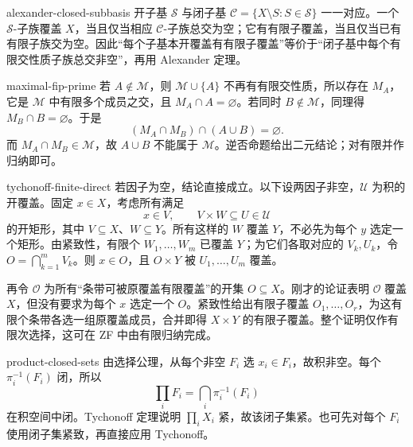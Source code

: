 \begin{solution}{alexander-closed-subbasis}
开子基 \(\mathcal S\) 与闭子基
\(\mathcal C=\{X\setminus S:S\in\mathcal S\}\) 一一对应。一个 \(\mathcal S\)-子族覆盖 \(X\)，当且仅当相应 \(\mathcal C\)-子族总交为空；它有有限子覆盖，当且仅当已有有限子族交为空。因此“每个子基本开覆盖有有限子覆盖”等价于“闭子基中每个有限交性质子族总交非空”，再用 Alexander 定理。
\end{solution}

\begin{solution}{maximal-fip-prime}
若 \(A\notin\mathcal M\)，则 \(\mathcal M\cup\{A\}\) 不再有有限交性质，所以存在 \(M_A\)，它是 \(\mathcal M\) 中有限多个成员之交，且 \(M_A\cap A=\varnothing\)。若同时 \(B\notin\mathcal M\)，同理得 \(M_B\cap B=\varnothing\)。于是
\[
 (M_A\cap M_B)\cap(A\cup B)=\varnothing.
\]
而 \(M_A\cap M_B\in\mathcal M\)，故 \(A\cup B\) 不能属于 \(\mathcal M\)。逆否命题给出二元结论；对有限并作归纳即可。
\end{solution}

\begin{solution}{tychonoff-finite-direct}
若因子为空，结论直接成立。以下设两因子非空，\(\mathcal U\) 为积的开覆盖。固定 \(x\in X\)，考虑所有满足
\[
 x\in V,\qquad V\times W\subseteq U\in\mathcal U
\]
的开矩形，其中 \(V\subseteq X\)、\(W\subseteq Y\)。所有这样的 \(W\) 覆盖 \(Y\)，不必先为每个 \(y\) 选定一个矩形。由紧致性，有限个 \(W_1,\ldots,W_m\) 已覆盖 \(Y\)；为它们各取对应的 \(V_k,U_k\)，令 \(O=\bigcap_{k=1}^m V_k\)。则 \(x\in O\)，且 \(O\times Y\) 被 \(U_1,\ldots,U_m\) 覆盖。

再令 \(\mathcal O\) 为所有“条带可被原覆盖有限覆盖”的开集 \(O\subseteq X\)。刚才的论证表明 \(\mathcal O\) 覆盖 \(X\)，但没有要求为每个 \(x\) 选定一个 \(O\)。紧致性给出有限子覆盖 \(O_1,\ldots,O_r\)，为这有限个条带各选一组原覆盖成员，合并即得 \(X\times Y\) 的有限子覆盖。整个证明仅作有限次选择，这可在 ZF 中由有限归纳完成。
\end{solution}

\begin{solution}{product-closed-sets}
由选择公理，从每个非空 \(F_i\) 选 \(x_i\in F_i\)，故积非空。每个
\(\pi_i^{-1}(F_i)\) 闭，所以
\[
 \prod_iF_i=\bigcap_i\pi_i^{-1}(F_i)
\]
在积空间中闭。Tychonoff 定理说明 \(\prod_iX_i\) 紧，故该闭子集紧。也可先对每个 \(F_i\) 使用闭子集紧致，再直接应用 Tychonoff。
\end{solution}
